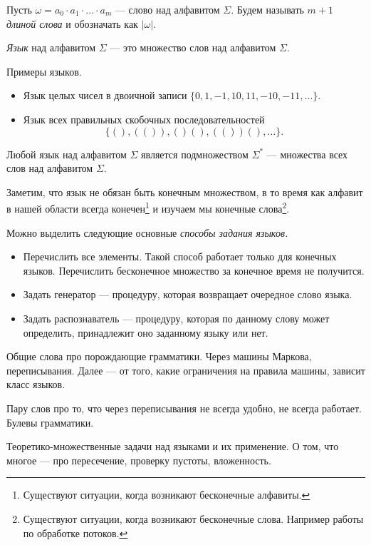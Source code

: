 \begin{definition}
Пусть $\omega = a_0 \cdot a_1 \cdot \ldots \cdot a_m$ --- слово над алфавитом $\Sigma$.
Будем называть $m + 1$ \textit{длиной слова} и обозначать как $|\omega|$.
\end{definition}

\begin{definition}
\textit{Язык} над алфавитом $\Sigma$ --- это множество слов над алфавитом $\Sigma$.
\end{definition}

\begin{example}

Примеры языков.

  \begin{itemize}
    \item Язык целых чисел в двоичной записи $\{0, 1, -1, 10, 11, -10, -11, \dots\}.$
    \item Язык всех правильных скобочных последовательностей $$\{(), (()), ()(), (())(), \dots\}.$$
  \end{itemize}
\end{example}

Любой язык над алфавитом $\Sigma$ является подмножеством $\Sigma^*$ --- множества всех слов над алфавитом $\Sigma$.

Заметим, что язык не обязан быть конечным множеством, в то время как алфавит в нашей области всегда конечен\footnote{Существуют ситуации, когда возникают бесконечные алфавиты.} и изучаем мы конечные слова\footnote{Существуют ситуации, когда возникают бесконечные слова. Например работы по обработке потоков.}.

Можно выделить следующие основные \textit{способы задания языков.}
\begin{itemize}
\item Перечислить все элементы. Такой способ работает только для конечных языков. Перечислить бесконечное множество за конечное время не получится.
\item Задать генератор --- процедуру, которая возвращает очередное слово языка.
\item Задать распознаватель --- процедуру, которая по данному слову может определить, принадлежит оно заданному языку или нет.
\end{itemize}


Общие слова про порождающие грамматики. Через машины Маркова, переписывания. Далее --- от того, какие ограничения на правила машины, зависит класс языков.

Пару слов про то, что через переписывания не всегда удобно, не всегда работает. Булевы грамматики.

Теоретико-множественные задачи над языками и их применение.
О том, что многое --- про пересечение, проверку пустоты, вложенность.





